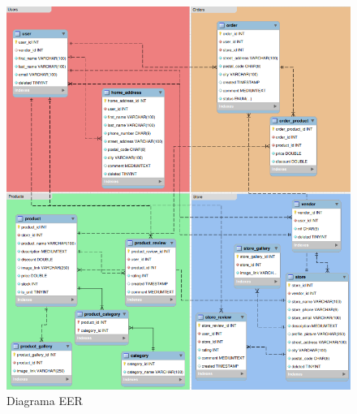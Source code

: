 \begin{figure}[H]
    \centering
    \includegraphics[width=\textwidth]{Figures/0. General/diagram.png}
    \caption{Diagrama EER}
    \label{Diagrama EER}
\end{figure}

\newpage


